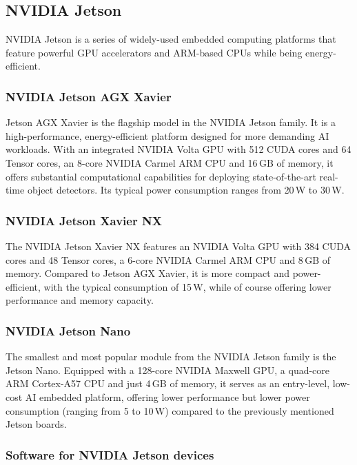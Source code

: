 \subsection{NVIDIA Jetson}
\label{Jetsons}

NVIDIA Jetson is a series of widely-used embedded computing platforms that
feature powerful GPU accelerators and ARM-based CPUs while being
energy-efficient.



\subsubsection{NVIDIA Jetson AGX Xavier}

Jetson AGX Xavier is the flagship model in the NVIDIA Jetson family. It is a
high-performance, energy-efficient platform designed for more demanding AI
workloads. With an integrated NVIDIA Volta GPU with 512 CUDA cores and 64 Tensor
cores, an 8-core NVIDIA Carmel ARM CPU and 16\,GB of memory, it offers substantial
computational capabilities for deploying state-of-the-art real-time object
detectors. Its typical power consumption ranges from 20\,W to 30\,W.


\subsubsection{NVIDIA Jetson Xavier NX}

The NVIDIA Jetson Xavier NX features an NVIDIA Volta GPU with 384 CUDA cores and
48 Tensor cores, a 6-core NVIDIA Carmel ARM CPU and 8\,GB of memory. Compared
to Jetson AGX Xavier, it is more compact and power-efficient, with the typical
consumption of 15\,W, while of course offering lower performance and memory
capacity.


\subsubsection{NVIDIA Jetson Nano}

The smallest and most popular module from the NVIDIA Jetson family is the Jetson
Nano. Equipped with a 128-core NVIDIA Maxwell GPU, a quad-core ARM Cortex-A57
CPU and just 4\,GB of memory, it serves as an entry-level, low-cost AI embedded
platform, offering lower performance but lower power consumption (ranging from 5
to 10\,W) compared to the previously mentioned Jetson boards.


\subsubsection{Software for NVIDIA Jetson devices}

